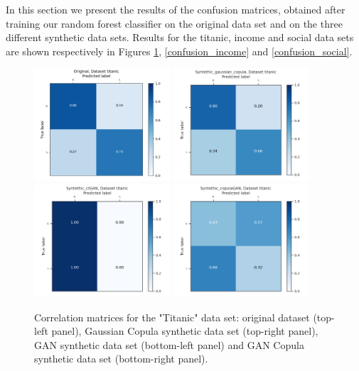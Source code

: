 \documentclass{article}
\begin{document}
In this section we present the results of the confusion matrices, obtained after training our random forest classifier on the original data set and on the three different synthetic data sets. Results for the titanic, income and social data sets are shown respectively in Figures \ref{confusion_titanic}, \ref{confusion_income} and \ref{confusion_social}. 


\begin{figure}[h!]
	\centering
	\includegraphics[width=0.45\textwidth]{../ConfusionMatrixes/titanic_Original_.png}
	\includegraphics[width=0.45\textwidth]{../ConfusionMatrixes/titanic_Syntethic_gaussian_copula_.png}
	\includegraphics[width=0.45\textwidth]{../ConfusionMatrixes/titanic_Syntethic_ctGAN_.png}
	\includegraphics[width=0.45\textwidth]{../ConfusionMatrixes/titanic_Syntethic_copulaGAN_.png}
	
	\caption{Correlation matrices for the "Titanic" data set: original dataset (top-left panel), Gaussian Copula synthetic data set (top-right panel), GAN synthetic data set (bottom-left panel) and GAN Copula synthetic data set (bottom-right panel).  }
	\label{confusion_titanic}
\end{figure}
\end{document}
